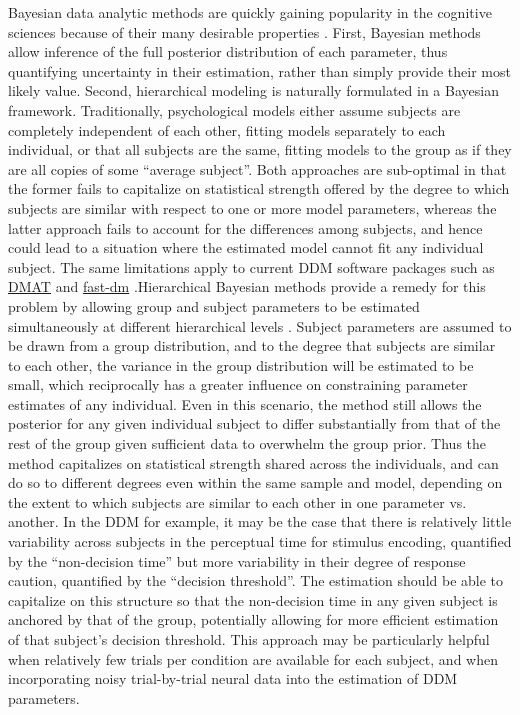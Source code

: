 \documentclass[letterpaper,10pt,english]{article}
\begin{document}
Bayesian data analytic methods are quickly gaining popularity in the
cognitive sciences because of their many desirable properties
\citep{LeeWagenmakers13,Kruschke10}. First, Bayesian methods allow
inference of the full posterior distribution of each parameter, thus
quantifying uncertainty in their estimation, rather than simply
provide their most likely value. Second, hierarchical modeling is
naturally formulated in a Bayesian framework. Traditionally,
psychological models either assume subjects are completely independent
of each other, fitting models separately to each individual, or that
all subjects are the same, fitting models to the group as if they are
all copies of some ``average subject''. Both approaches are
sub-optimal in that the former fails to capitalize on statistical
strength offered by the degree to which subjects are similar with
respect to one or more model parameters, whereas the latter approach
fails to account for the differences among subjects, and hence could
lead to a situation where the estimated model cannot fit any
individual subject. The same limitations apply to current DDM software
packages such as
\href{http://ppw.kuleuven.be/okp/software/dmat/}{DMAT}
\citep{VandekerckhoveTuerlinckx08} and
\href{http://seehuhn.de/pages/fast-dm}{fast-dm}
\citep{VossVoss07}.Hierarchical Bayesian methods provide a remedy for
this problem by allowing group and subject parameters to be estimated
simultaneously at different hierarchical levels
\citep{LeeWagenmakers13,Kruschke10,VandekerckhoveTuerlinckxLee11}.
Subject parameters are assumed to be drawn from a group distribution,
and to the degree that subjects are similar to each other, the
variance in the group distribution will be estimated to be small,
which reciprocally has a greater influence on constraining parameter
estimates of any individual. Even in this scenario, the method still
allows the posterior for any given individual subject to differ
substantially from that of the rest of the group given sufficient data
to overwhelm the group prior. Thus the method capitalizes on
statistical strength shared across the individuals, and can do so to
different degrees even within the same sample and model, depending on
the extent to which subjects are similar to each other in one
parameter vs. another. In the DDM for example, it may be the case that
there is relatively little variability across subjects in the
perceptual time for stimulus encoding, quantified by the
``non-decision time'' but more variability in their degree of response
caution, quantified by the ``decision threshold''. The estimation
should be able to capitalize on this structure so that the
non-decision time in any given subject is anchored by that of the
group, potentially allowing for more efficient estimation of that
subject's decision threshold. This approach may be particularly
helpful when relatively few trials per condition are available for
each subject, and when incorporating noisy trial-by-trial neural data
into the estimation of DDM parameters.
\end{document}
